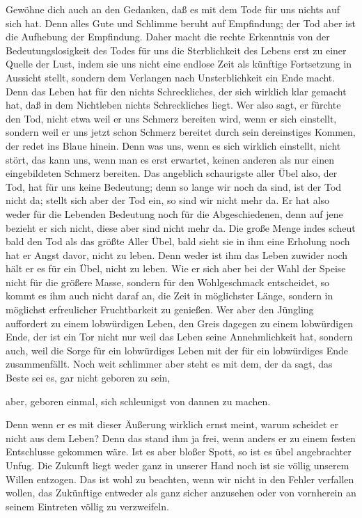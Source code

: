 \documentclass{stex}
\begin{document}
Gewöhne dich auch an den Gedanken, daß es mit dem Tode für uns nichts auf sich hat.
Denn alles Gute und Schlimme beruht auf Empfindung; der Tod aber ist die Aufhebung der Empfindung.
Daher macht die rechte Erkenntnis von der Bedeutungslosigkeit des Todes für uns die Sterblichkeit des Lebens erst zu einer Quelle der Lust, indem sie uns nicht eine endlose Zeit als künftige Fortsetzung in Aussicht stellt, sondern dem Verlangen nach Unsterblichkeit ein Ende macht.
Denn das Leben hat für den nichts Schreckliches, der sich wirklich klar gemacht hat, daß in dem Nichtleben nichts Schreckliches liegt.
Wer also sagt, er fürchte den Tod, nicht etwa weil er uns Schmerz bereiten wird, wenn er sich einstellt, sondern weil er uns jetzt schon Schmerz bereitet durch sein dereinstiges Kommen, der redet ins Blaue hinein.
Denn was uns, wenn es sich wirklich einstellt, nicht stört, das kann uns, wenn man es erst erwartet, keinen anderen als nur einen eingebildeten Schmerz bereiten.
Das angeblich schaurigste aller Übel also, der Tod, hat für uns keine Bedeutung; denn so lange wir noch da sind, ist der Tod nicht da; stellt sich aber der Tod ein, so sind wir nicht mehr da.
Er hat also weder für die Lebenden Bedeutung noch für die Abgeschiedenen, denn auf jene bezieht er sich nicht, diese aber sind nicht mehr da.
Die große Menge indes scheut bald den Tod als das größte Aller Übel, bald sieht sie in ihm eine Erholung  noch hat er Angst davor, nicht zu leben.
Denn weder ist ihm das Leben zuwider noch hält er es für ein Übel, nicht zu leben.
Wie er sich aber bei der Wahl der Speise nicht für die größere Masse, sondern für den Wohlgeschmack entscheidet, so kommt es ihm auch nicht daraf an, die Zeit in möglichster Länge, sondern in möglichst erfreulicher Fruchtbarkeit zu genießen.
Wer aber den Jüngling auffordert zu einem lobwürdigen Leben, den Greis dagegen zu einem lobwürdigen Ende, der ist ein Tor nicht nur weil das Leben seine Annehmlichkeit hat, sondern auch, weil die Sorge für ein lobwürdiges Leben mit der für ein lobwürdiges Ende zusammenfällt.
Noch weit schlimmer aber steht es mit dem, der da sagt, das Beste sei es, gar nicht geboren zu sein,
\begin{displayquote}
  aber, geboren einmal, sich schleunigst von dannen zu machen.
\end{displayquote}
Denn wenn er es mit dieser Äußerung wirklich ernst meint, warum scheidet er nicht aus dem Leben?
Denn das stand ihm ja frei, wenn anders er zu einem festen Entschlusse gekommen wäre.
Ist es aber bloßer Spott, so ist es übel angebrachter Unfug.
Die Zukunft liegt weder ganz in unserer Hand noch ist sie völlig unserem Willen entzogen.
Das ist wohl zu beachten, wenn wir nicht in den Fehler verfallen wollen, das Zukünftige entweder als ganz sicher anzusehen oder von vornherein an seinem Eintreten völlig zu verzweifeln.
\end{document}
